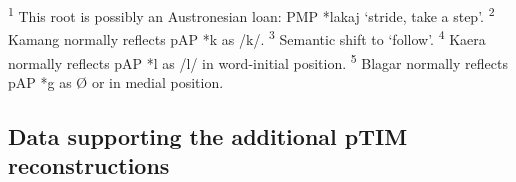 \raggedright
 
\textsuperscript{1} This root is possibly an Austronesian loan: PMP *lakaj `stride, take a step'.  
\textsuperscript{2} Kamang normally reflects pAP *k as /k/.  
\textsuperscript{3} Semantic shift to `follow'. 
\textsuperscript{4} Kaera normally reflects pAP *l as /l/ in word-initial position.
\textsuperscript{5} Blagar normally reflects pAP *g as {\O} or {\textglotstop} in medial position.

\newpage
\subsection{Data supporting the additional pTIM reconstructions}
\label{sec:3:app:2}
 
